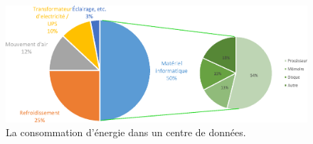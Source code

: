 \begin{figure}
    \begin{center}
        \includegraphics[scale=0.7]{chapitre1/chap1Fig/datacenters-energy.eps}
        \caption{La consommation d'énergie dans un centre de données.}
        \label{fig:datacenters-energy}
    \end{center}
\end{figure}

